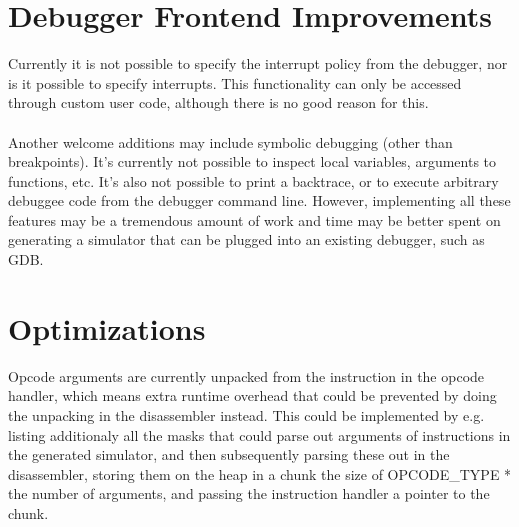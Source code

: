 \section{Debugger Frontend Improvements}
Currently it is not possible to specify the interrupt policy from the
debugger, nor is it possible to specify interrupts. This functionality can
only be accessed through custom user code, although there is no good reason
for this.\\
\\
Another welcome additions may include symbolic debugging (other than
breakpoints). It's currently not possible to inspect local variables,
arguments to functions, etc. It's also not possible to print a backtrace, or
to execute arbitrary debuggee code from the debugger command line. 
However, implementing all these
features may be a tremendous amount of work and time may be better spent on
generating a simulator that can be plugged into an existing debugger, such as
GDB.

\section{Optimizations}
Opcode arguments are currently unpacked from the instruction in the opcode
handler, which means extra runtime overhead that could be prevented by doing
the unpacking in the disassembler instead. This could be implemented by e.g.
listing additionaly all the masks that could parse out arguments of
instructions in the generated simulator, and then subsequently parsing these
out in the disassembler, storing them on the heap in a chunk the size of 
OPCODE\_TYPE * the number of arguments, and passing the instruction handler a 
pointer to the chunk.
